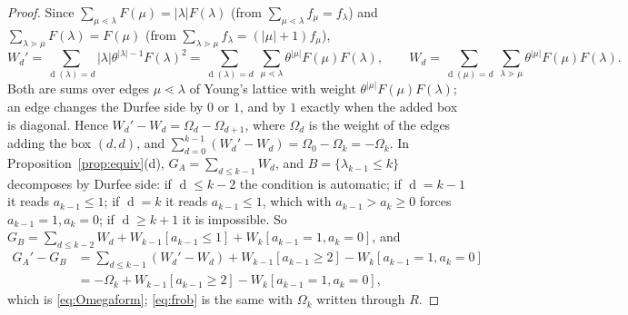 \documentclass[11pt]{article}
\theoremstyle{definition}
\theoremstyle{remark}
\DeclareMathOperator{\Durfee}{d}
\begin{document}
\begin{proof}
Since $\sum_{\mu\lessdot\lambda}F(\mu)=|\lambda|F(\lambda)$ (from $\sum_{\mu\lessdot\lambda}f_\mu=f_\lambda$) and $\sum_{\lambda\gtrdot\mu}F(\lambda)=F(\mu)$ (from $\sum_{\lambda\gtrdot\mu}f_\lambda=(|\mu|+1)f_\mu$),
\[
W_d'=\sum_{\Durfee(\lambda)=d}|\lambda|\theta^{|\lambda|-1}F(\lambda)^2=\sum_{\Durfee(\lambda)=d}\ \sum_{\mu\lessdot\lambda}\theta^{|\mu|}F(\mu)F(\lambda),
\qquad
W_d=\sum_{\Durfee(\mu)=d}\ \sum_{\lambda\gtrdot\mu}\theta^{|\mu|}F(\mu)F(\lambda).
\]
Both are sums over edges $\mu\lessdot\lambda$ of Young's lattice with weight $\theta^{|\mu|}F(\mu)F(\lambda)$; an edge changes the Durfee side by $0$ or $1$, and by $1$ exactly when the added box is diagonal. Hence $W_d'-W_d=\Omega_d-\Omega_{d+1}$, where $\Omega_d$ is the weight of the edges adding the box $(d,d)$, and $\sum_{d=0}^{k-1}(W_d'-W_d)=\Omega_0-\Omega_k=-\Omega_k$. In Proposition~\ref{prop:equiv}(d), $G_A=\sum_{d\le k-1}W_d$, and $B=\{\lambda_{k-1}\le k\}$ decomposes by Durfee side: if $\Durfee\le k-2$ the condition is automatic; if $\Durfee=k-1$ it reads $a_{k-1}\le1$; if $\Durfee=k$ it reads $a_{k-1}\le1$, which with $a_{k-1}>a_k\ge0$ forces $a_{k-1}=1,a_k=0$; if $\Durfee\ge k+1$ it is impossible. So $G_B=\sum_{d\le k-2}W_d+W_{k-1}[a_{k-1}\le1]+W_k[a_{k-1}=1,a_k=0]$, and
\begin{align*}
G_A'-G_B&=\sum_{d\le k-1}(W_d'-W_d)+W_{k-1}[a_{k-1}\ge2]-W_k[a_{k-1}=1,a_k=0]\\
&=-\Omega_k+W_{k-1}[a_{k-1}\ge2]-W_k[a_{k-1}=1,a_k=0],
\end{align*}
which is \eqref{eq:Omegaform}; \eqref{eq:frob} is the same with $\Omega_k$ written through $R$.
\end{proof}
\end{document}
